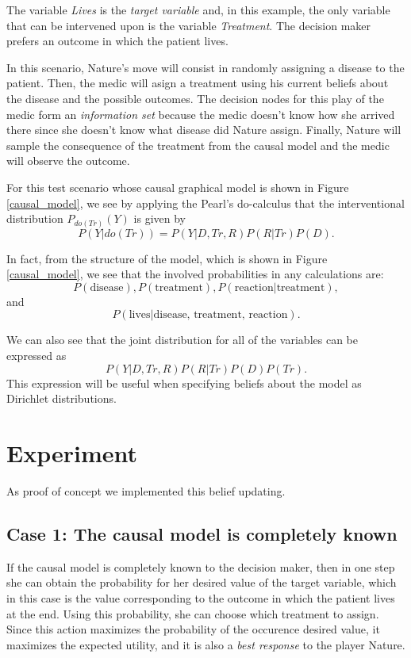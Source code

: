 \documentclass{article}
\begin{document}
The variable \textit{Lives} is the \textit{target variable} and, in this example, the only variable that can be intervened upon is the variable \textit{Treatment}. The decision maker prefers an outcome in which the patient lives.

In this scenario, Nature's move will consist in randomly assigning a disease to the patient. Then, the medic will asign a treatment using his current beliefs about the disease and the possible outcomes. The decision nodes for this play of the medic form an \textit{information set} because the medic doesn't know how she arrived there since she doesn't know what disease did Nature assign. Finally, Nature will sample the consequence of the treatment from the causal model and the medic will observe the outcome.

For this test scenario whose causal graphical model is shown in Figure \ref{causal_model}, we see  by applying the Pearl's do-calculus that the interventional distribution $P_{do(Tr)}(Y)$ is given by
\[ P(Y | do(Tr))=P(Y | D, Tr, R)P(R | Tr) P(D). \]

In fact, from the structure of the model, which is shown in Figure \ref{causal_model}, we see that the involved probabilities in any calculations are:
\[ P(\textrm{disease}), P(\textrm{treatment}), P(\textrm{reaction} | \textrm{treatment}), \]
and
\[P(\textrm{lives} | \textrm{disease, treatment, reaction}). \]

We can also see that the joint distribution for all of the variables can be expressed as
\[ P(Y | D, Tr, R)P(R | Tr) P(D)P(Tr). \]
This expression will be useful when specifying beliefs about the model as Dirichlet distributions.
\section{Experiment}
As proof of concept we implemented this belief updating. 

\subsection{Case 1: The causal model is completely known}
If the causal model is completely known to the decision maker, then in one step she can obtain the probability for her desired value of the target variable, which in this case is the value corresponding to the outcome in which the patient lives at the end. Using this probability, she can choose which treatment to assign. Since this action maximizes the probability of the occurence desired value, it maximizes the expected utility, and it is also a \textit{best response} to the player Nature.
\end{document}
